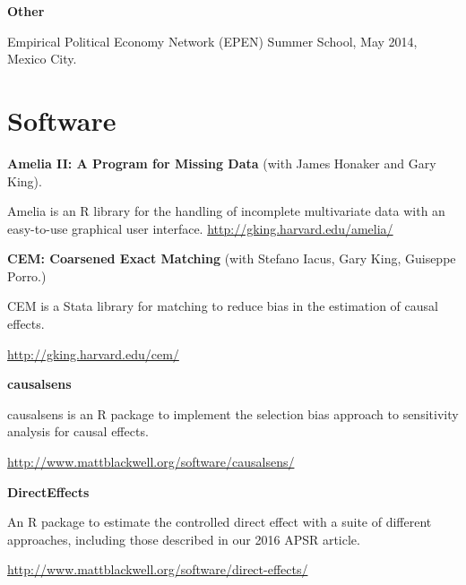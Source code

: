 \documentclass[margin,line,12pt]{res}
\newenvironment{list1}{
  \begin{list}{\ding{113}}{%
      \setlength{\itemsep}{0in}
      \setlength{\parsep}{0in} \setlength{\parskip}{0in}
      \setlength{\topsep}{0in} \setlength{\partopsep}{0in} 
      \setlength{\leftmargin}{0.83 cm}}}{\end{list}}
\begin{document}
\begin{resume}
{\bf Other}
\begin{list1}
\item[] Empirical Political Economy Network (EPEN) Summer School, May 2014, Mexico City. 
\end{list1}



\section{\sc Software}
{\bf Amelia II: A Program for Missing Data} (with James Honaker and Gary
King). 
\begin{list1}
\item[] Amelia is an R library for the handling of incomplete multivariate
  data with an easy-to-use graphical user
  interface. \url{http://gking.harvard.edu/amelia/} 
\end{list1}
{\bf CEM: Coarsened Exact Matching} (with Stefano Iacus, Gary
King, Guiseppe  Porro.)
\begin{list1}
\item[] CEM is a Stata library for matching to reduce bias in the estimation of
  causal effects. 
\item[] \url{http://gking.harvard.edu/cem/}
\end{list1}
{\bf causalsens} 
\begin{list1}
\item[] causalsens is an R package to implement the selection bias approach to sensitivity analysis for causal effects.
\item[] \url{http://www.mattblackwell.org/software/causalsens/}
\end{list1}

{\bf DirectEffects} 
\begin{list1}
\item[] An R package to estimate the controlled direct effect with a suite of different approaches, including those described in our 2016 APSR article.
\item[] \url{http://www.mattblackwell.org/software/direct-effects/}
\end{list1}



\end{resume}
\end{document}
